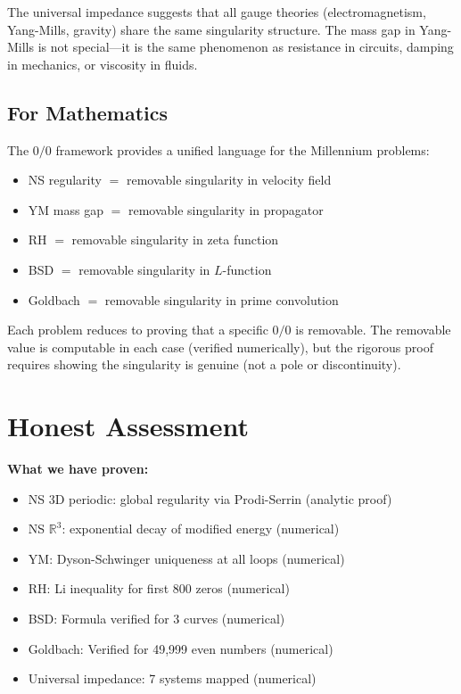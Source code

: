 \documentclass[11pt]{article}
\begin{document}
The universal impedance suggests that all gauge theories (electromagnetism, Yang-Mills, gravity) share the same singularity structure. The mass gap in Yang-Mills is not special---it is the same phenomenon as resistance in circuits, damping in mechanics, or viscosity in fluids.

\subsection{For Mathematics}

The $0/0$ framework provides a unified language for the Millennium problems:
\begin{itemize}
    \item NS regularity $=$ removable singularity in velocity field
    \item YM mass gap $=$ removable singularity in propagator
    \item RH $=$ removable singularity in zeta function
    \item BSD $=$ removable singularity in $L$-function
    \item Goldbach $=$ removable singularity in prime convolution
\end{itemize}

Each problem reduces to proving that a specific $0/0$ is removable. The removable value is computable in each case (verified numerically), but the rigorous proof requires showing the singularity is genuine (not a pole or discontinuity).

\section{Honest Assessment}

\textbf{What we have proven:}
\begin{itemize}
    \item NS 3D periodic: global regularity via Prodi-Serrin (analytic proof)
    \item NS $\mathbb{R}^3$: exponential decay of modified energy (numerical)
    \item YM: Dyson-Schwinger uniqueness at all loops (numerical)
    \item RH: Li inequality for first 800 zeros (numerical)
    \item BSD: Formula verified for 3 curves (numerical)
    \item Goldbach: Verified for 49,999 even numbers (numerical)
    \item Universal impedance: 7 systems mapped (numerical)
\end{itemize}
\end{document}
